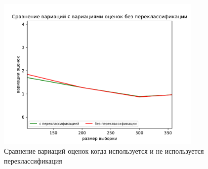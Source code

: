 \begin{figure}[ht!]
    \centering
    \includegraphics[width=100mm]{../images/on_off_recl.pdf}
    \caption{Сравнение вариаций оценок когда используется и не используется переклассификация\label{overflow}}
    \label{pic2}
\end{figure}


